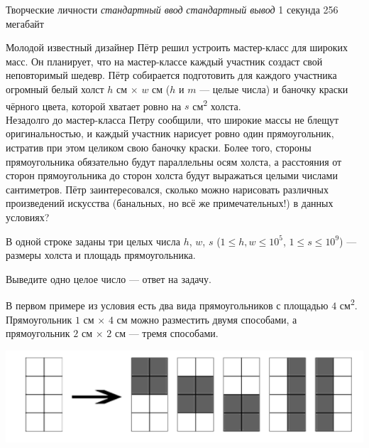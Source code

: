 \begin{problem}%
{Творческие личности}%
{\textsl{стандартный ввод}}%
{\textsl{стандартный вывод}}%
{1 секунда}%
{256 мегабайт}%
{}

Молодой известный дизайнер Пётр решил устроить мастер-класс для широких масс. Он планирует, что на мастер-классе каждый участник создаст свой неповторимый шедевр. Пётр собирается подготовить для каждого участника огромный белый холст $h$ см $\times$ $w$ см  ($h$ и $m$ — целые числа) и баночку краски чёрного цвета, которой хватает ровно на $s$ см\textsuperscript{2}  холста.\\

Незадолго до мастер-класса Петру сообщили, что широкие массы не блещут оригинальностью, и каждый участник нарисует ровно один прямоугольник, истратив при этом целиком свою баночку краски. Более того, стороны прямоугольника обязательно будут параллельны осям холста, а расстояния от сторон прямоугольника до сторон холста будут выражаться целыми числами сантиметров. Пётр заинтересовался, сколько можно нарисовать различных произведений искусства (банальных, но всё же примечательных!) в данных условиях?

\InputFile

В одной строке заданы три целых числа $h$, $w$, $s$ ($1 \le h, w \le 10^5$, $1 \le s \le 10^9$) — размеры холста и площадь прямоугольника.

\OutputFile

Выведите одно целое число — ответ на задачу.

\Examples

\begin{example}
%
%
%
\end{example}

\Explanation

В первом примере из условия есть два вида прямоугольников с площадью $4$ см\textsuperscript{2}. Прямоугольник $1$ см $\times$ $4$ см можно разместить двумя способами, а прямоугольник $2$ см $\times$ $2$ см — тремя способами.

\begin{center}
\begin{adjustbox}{max size={\textwidth}{\textheight}}
\includegraphics{images/2964.png}
\end{adjustbox}
\end{center}


\end{problem}
